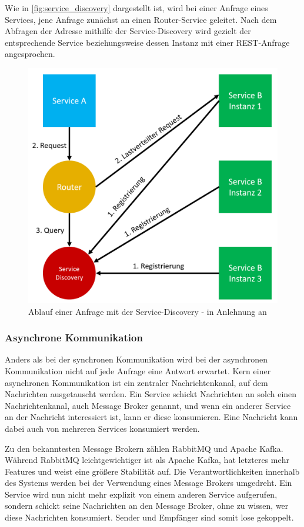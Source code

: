 Wie in \autoref{fig:service_discovery} dargestellt ist, wird bei einer Anfrage eines Services, jene Anfrage zunächst an einen Router-Service geleitet. Nach dem Abfragen der Adresse mithilfe der Service-Discovery wird gezielt der entsprechende Service beziehungsweise dessen Instanz mit einer REST-Anfrage angesprochen.

\begin{figure}[H]
    \centering
    \includegraphics[width=0.65\linewidth]{images/service-discovery.png}
    \caption{Ablauf einer Anfrage mit der Service-Discovery - in Anlehnung an \cite{MichaelSchwab.2019}}
    \label{fig:service_discovery}
\end{figure}

\subsubsection*{Asynchrone Kommunikation}

Anders als bei der synchronen Kommunikation wird bei der asynchronen Kommunikation nicht auf jede Anfrage eine Antwort erwartet. Kern einer asynchronen Kommunikation ist ein zentraler Nachrichtenkanal, auf dem Nachrichten ausgetauscht werden. Ein Service schickt Nachrichten an solch einen Nachrichtenkanal, auch Message Broker genannt, und wenn ein anderer Service an der Nachricht interessiert ist, kann er diese konsumieren. Eine Nachricht kann dabei auch von mehreren Services konsumiert werden.

Zu den bekanntesten Message Brokern zählen RabbitMQ und Apache Kafka. Während RabbitMQ leichtgewichtiger ist als Apache Kafka, hat letzteres mehr Features und weist eine größere Stabilität auf. Die Verantwortlichkeiten innerhalb des Systems werden bei der Verwendung eines Message Brokers umgedreht. Ein Service wird nun nicht mehr explizit von einem anderen Service aufgerufen, sondern schickt seine Nachrichten an den Message Broker, ohne zu wissen, wer diese Nachrichten konsumiert. Sender und Empfänger sind somit lose gekoppelt.

